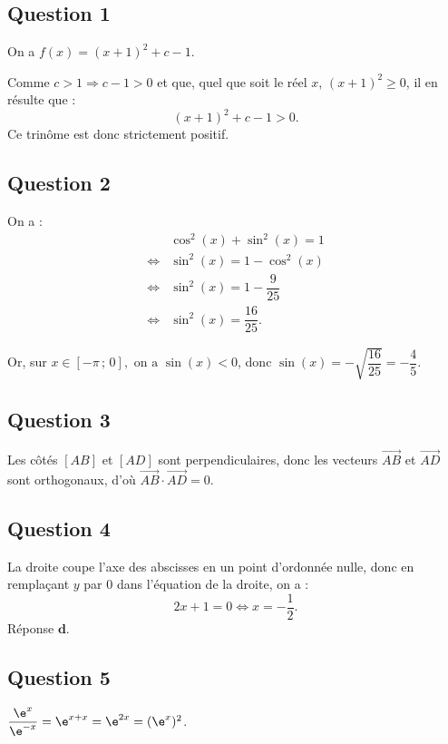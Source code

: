\subsection*{Question 1}

On a \( f(x) = (x + 1)^2 + c - 1 \).

Comme \( c > 1 \Rightarrow c - 1 > 0 \) et que, quel que soit le réel \( x \), \( (x + 1)^2 \geqslant 0 \), il en résulte que :
\[
(x + 1)^2 + c - 1 > 0.
\]
Ce trinôme est donc strictement positif.

\subsection*{Question 2}

On a :
\begin{align*}
&\cos^2(x) + \sin^2(x) = 1 \\
\iff &\sin^2(x) = 1 - \cos^2(x) \\
\iff &\sin^2(x) = 1 - \dfrac{9}{25} \\
\iff &\sin^2(x) = \dfrac{16}{25}.
\end{align*}

Or, sur \( x \in [-\pi \,;\, 0], \text{ on a } \sin(x) < 0 \), donc \( \sin(x) = -\sqrt{\dfrac{16}{25}} = -\dfrac{4}{5} \).

\subsection*{Question 3}

Les côtés \([AB]\) et \([AD]\) sont perpendiculaires, donc les vecteurs \(\overrightarrow{AB}\) et \(\overrightarrow{AD}\) sont orthogonaux, d'où \(\overrightarrow{AB} \cdot \overrightarrow{AD} = 0\).

\subsection*{Question 4}

La droite coupe l'axe des abscisses en un point d'ordonnée nulle, donc en remplaçant \(y\) par 0 dans l'équation de la droite, on a :
\[
2x + 1 = 0 \iff x = -\dfrac{1}{2}.
\]
Réponse \(\textbf{d.}\)

\subsection*{Question 5}

\( \dfrac{\e^x}{\e^{-x}} = \e^{x + x} = \e^{2x} = (\e^x)^2 \).
